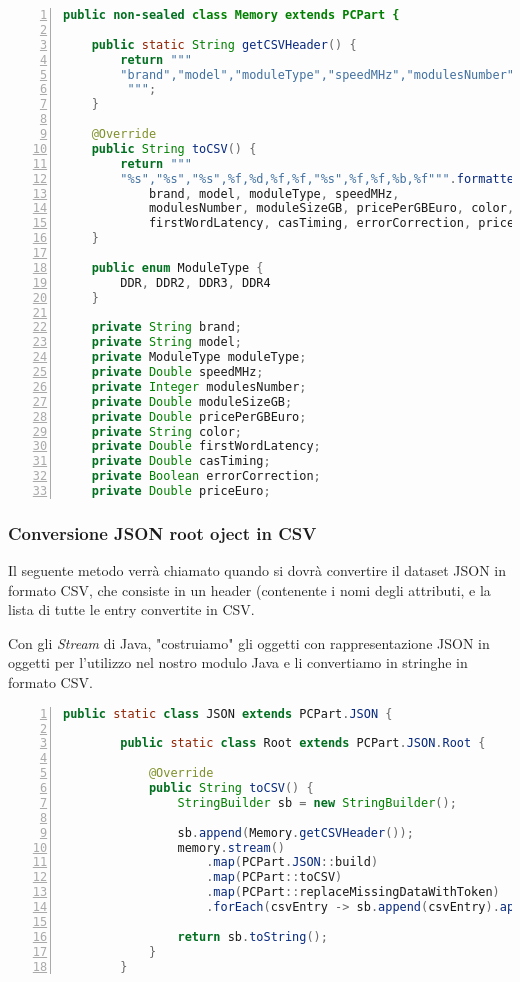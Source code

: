 \documentclass[12pt]{report}
\begin{document}
\begin{lstlisting}[language=Java, numbers=left, basicstyle=\scriptsize\ttfamily, breaklines=true]
public non-sealed class Memory extends PCPart {

	public static String getCSVHeader() {
		return """
		"brand","model","moduleType","speedMHz","modulesNumber","moduleSizeGB","pricePerGBEuro","color","firstWordLatency","casTiming","errorCorrection","priceEuro"
		 """;
	}

	@Override
	public String toCSV() {
		return """
		"%s","%s","%s",%f,%d,%f,%f,"%s",%f,%f,%b,%f""".formatted(
			brand, model, moduleType, speedMHz,
			modulesNumber, moduleSizeGB, pricePerGBEuro, color,
			firstWordLatency, casTiming, errorCorrection, priceEuro);
	}

	public enum ModuleType {
		DDR, DDR2, DDR3, DDR4
	}

	private String brand;
	private String model;
	private ModuleType moduleType;
	private Double speedMHz;
	private Integer modulesNumber;
	private Double moduleSizeGB;
	private Double pricePerGBEuro;
	private String color;
	private Double firstWordLatency;
	private Double casTiming;
	private Boolean errorCorrection;
	private Double priceEuro;

\end{lstlisting}

\newpage
\subsubsection{Conversione JSON root oject in CSV}

Il seguente metodo verrà chiamato quando si dovrà convertire il dataset JSON in formato CSV,
che consiste in un header (contenente i nomi degli attributi, e la lista di tutte
le entry convertite in CSV.

Con gli \textit{Stream} di Java, "costruiamo" gli oggetti con rappresentazione JSON in oggetti
per l'utilizzo nel nostro modulo Java e li convertiamo in stringhe in formato CSV.

\begin{lstlisting}[language=Java, numbers=left, basicstyle=\scriptsize\ttfamily, breaklines=true]
	public static class JSON extends PCPart.JSON {

		public static class Root extends PCPart.JSON.Root {

			@Override
			public String toCSV() {
				StringBuilder sb = new StringBuilder();

				sb.append(Memory.getCSVHeader());
				memory.stream()
					.map(PCPart.JSON::build)
					.map(PCPart::toCSV)
					.map(PCPart::replaceMissingDataWithToken)
					.forEach(csvEntry -> sb.append(csvEntry).append("\n"));

				return sb.toString();
			}
		}
\end{lstlisting}
\end{document}
